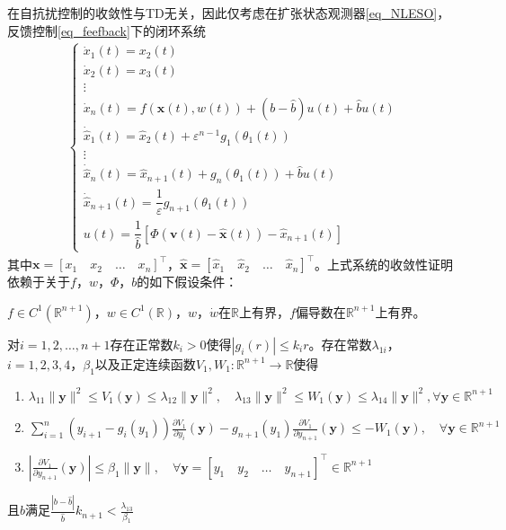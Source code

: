 在自抗扰控制的收敛性与TD无关，因此仅考虑在扩张状态观测器\eqref{eq_NLESO}，反馈控制\eqref{eq_feefback}下的闭环系统
\begin{align}
\left\{\begin{array}{l}
\dot{x}_{1}(t)=x_{2}(t) \\
\dot{x}_{2}(t)=x_{3}(t) \\
\vdots \\
\dot{x}_{n}(t)=f(\bm{x}(t), w(t))+\left(b-\hat{b}\right) u(t)+\hat{b} u(t) \\
\dot{\hat{x}}_{1}(t)=\hat{x}_{2}(t)+\varepsilon^{n-1} g_{1}\left(\theta_{1}(t)\right) \\
\vdots \\
\dot{\hat{x}}_{n}(t)=\hat{x}_{n+1}(t)+g_{n}\left(\theta_{1}(t)\right)+\hat{b} u(t) \\
\dot{\hat{x}}_{n+1}(t)=\dfrac{1}{\varepsilon} g_{n+1}\left(\theta_{1}(t)\right) \\
u(t)=\dfrac{1}{\hat{b}}\left[\Phi\left(\bm{v}(t)-\hat{\bm{x}}(t)\right)-\hat{x}_{n+1}(t)\right]
\end{array}\right.	\label{eq_close}
\end{align}
其中${\bm{x}}=\left[{x}_{1} \quad {x}_{2} \quad \ldots \quad {x}_{n}\right]^\top $，$\hat{\bm{x}}=\left[\hat{x}_{1} \quad \hat{x}_{2} \quad \ldots \quad \hat{x}_{n}\right]^\top $。上式系统的收敛性证明依赖于关于$ f$，$w$，$\Phi$，$b $的如下假设条件：

\begin{assumption}
	$f \in C^{1}\left(\mathbb{R}^{n+1}\right)$，$ w \in C^{1}(\mathbb{R})$，$ w$，$\dot{w}$在$ \mathbb{R} $上有界，$f$偏导数在$\mathbb{R}^{n+1}$上有界。	\label{A1}
\end{assumption}

\begin{assumption}
	对$ i=1,2,\ldots,n+1 $存在正常数$ k_i >0 $使得$\left|g_{i}(r)\right| \leq k_{i} r$。存在常数$\lambda_{1 i}$，$i=1,2,3,4$，$\beta_{1}$以及正定连续函数$V_1, W_1: \mathbb{R}^{n+1} \rightarrow \mathbb{R}$使得
	\begin{enumerate}
		\item $ \lambda_{11}\|\bm{y}\|^{2} \leq V_{1}(\bm{y}) \leq \lambda_{12}\|\bm{y}\|^{2}, \quad \lambda_{13}\|\bm{y}\|^{2} \leq W_{1}(\bm{y}) \leq \lambda_{14}\|\bm{y}\|^{2}, \forall \bm{y} \in \mathbb{R}^{n+1} $
		\item $ \sum_{i=1}^{n}\left(y_{i+1}-g_{i}\left(y_{1}\right)\right) \frac{\partial V_{1}}{\partial y_{i}}(\bm{y})-g_{n+1}\left(y_{1}\right) \frac{\partial V_{1}}{\partial y_{n+1}}(\bm{y}) \leq-W_{1}(\bm{y}),\quad \forall \bm{y} \in \mathbb{R}^{n+1} $
		\item $ \left|\frac{\partial V_{1}}{\partial y_{n+1}}(\bm{y})\right| \leq \beta_{1}\|\bm{y}\|,\quad \forall \bm{y}=[y_{1} \quad y_{2} \quad \ldots \quad y_{n+1}]^\top \in \mathbb{R}^{n+1} $	
	\end{enumerate}	\label{A2}
且$ b $满足$\frac{\left|b-\hat{b}\right|}{\hat{b}} k_{n+1}<\frac{\lambda_{13}}{\beta_{1}}$
\end{assumption}

